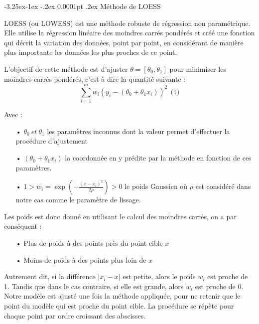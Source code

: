 \documentclass[a4paper,12pt]{article} %
\makeatletter
\renewcommand\paragraph{\@startsection{paragraph}{4}{\z@}%
                                      {-3.25ex\@plus -1ex \@minus -.2ex}%
                                      {0.0001pt \@plus .2ex}%
                                      {\normalfont\normalsize\bfseries}}
\makeatother
\begin{document}
                    
			    \paragraph{Méthode de LOESS}
			    
                    LOESS (ou LOWESS) est une méthode robuste de régression non paramétrique. Elle utilise la régression linéaire des moindres carrés pondérés et créé une fonction qui décrit la variation des données, point par point, en considérant de manière plus importante les données les plus proches de ce point.
                    
                    L'objectif de cette méthode est d'ajuster $\theta = [\theta_0, \theta_1]$ pour minimiser les moindres carrés pondérés, c'est à dire la quantité suivante : \[\sum_{i=1}^m w_i ( y_i - (\theta_0 + \theta_1 x_i))^2 \ \ \text{(1)}\]
                    
                    Avec : 
                    \begin{itemize}
                        \item[•]  $\theta_0 \ et \ \theta_1$ les paramètres inconnus dont la valeur permet d'effectuer la procédure d'ajustement  
                        \item[•]  $(\theta_0 + \theta_1 x_i)$ la coordonnée en y prédite par la méthode en fonction de ces paramètres.
                        \item[•]  $1 > w_i = \exp \left( - \frac{(x -x_i)^2}{2 \rho} \right) > 0$ le poids Gaussien où  $\rho$ est considéré dans notre cas comme le paramètre de lissage.
                    \end{itemize}
                    
                    Les poids est donc donné en utilisant le calcul des moindres carrés, on a par conséquent :
                    \begin{itemize}
                        \item[•] Plus de poids à des points près du point cible $x$ 
                        \item[•] Moins de poids à des points plus loin de $x$
                    \end{itemize}
                    Autrement dit, si la différence $| x_i - x |$ est petite, alors le poids $w_i$ est proche de 1. Tandis que dans le cas contraire, si elle est grande, alors $w_i$ est proche de 0. 
                    Notre modèle est ajusté une fois la méthode appliquée, pour ne retenir que le point du modèle qui est proche du point cible. La procédure se répète pour chaque point par ordre croissant des abscisses.
                    
\end{document}
